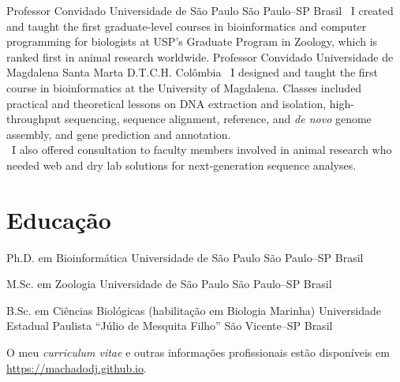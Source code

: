 \documentclass[11pt, letterpaper, sans]{moderncv}
\begin{document}
%
{Professor Convidado}
{Universidade de São Paulo}
{São Paulo--SP}
{Brasil}
{
\textbullet~I created and taught the first graduate-level courses in bioinformatics and computer programming for biologists at USP's Graduate Program in Zoology, which is ranked first in animal research worldwide.
}
%
{Professor Convidado}
{Universidade de Magdalena}
{Santa Marta D.T.C.H.}
{Colômbia}
{
\textbullet~I designed and taught the first course in bioinformatics at the University of Magdalena. Classes included practical and theoretical lessons on DNA extraction and isolation, high-throughput sequencing, sequence alignment, reference, and \textit{de novo} genome assembly, and gene prediction and annotation.\\
\textbullet~I also offered consultation to faculty members involved in animal research who needed web and dry lab solutions for next-generation sequence analyses.
}


\vspace{-1em}

\section{Educação}

{Ph.D. em Bioinformática}
{Universidade de São Paulo}
{São Paulo--SP}
{Brasil}
{}

{M.Sc. em Zoologia}
{Universidade de São Paulo}
{São Paulo--SP}
{Brasil}
{}

{B.Sc. em Ciências Biológicas (habilitação em Biologia Marinha)}
{Universidade Estadual Paulista ``Júlio de Mesquita Filho''}
{São Vicente--SP}
{Brasil}
{}

O meu \textit{curriculum vitae} e outras informações profissionais estão disponíveis em \url{https://machadodj.github.io}.
\end{document}
